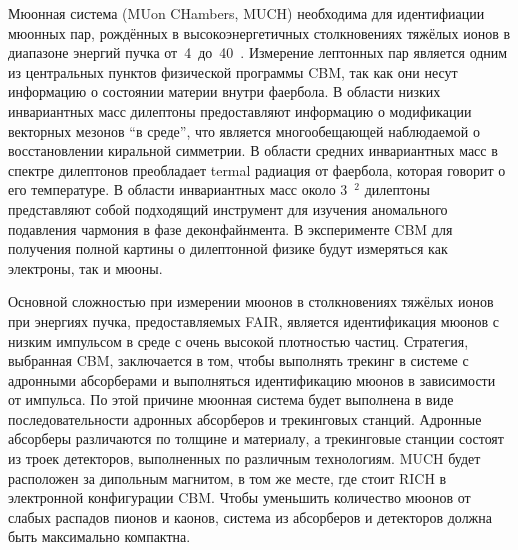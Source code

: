 Мюонная система (MUon CHambers, MUCH) необходима для идентифиации мюонных пар, рождённых в высокоэнергетичных столкновениях тяжёлых ионов в диапазоне энергий пучка от~4~до~40~\GeVperNucl. Измерение лептонных пар является одним из центральных пунктов физической программы CBM, так как они несут информацию о состоянии материи внутри фаербола. В области низких инвариантных масс дилептоны предоставляют информацию о модификации векторных мезонов ``в среде'', что является многообещающей наблюдаемой о восстановлении киральной симметрии. В области средних инвариантных масс в спектре дилептонов преобладает termal \todo радиация от фаербола, которая говорит о его температуре. В области инвариантных масс около 3~\GeVoverC$^{2} $ дилептоны представляют собой подходящий инструмент для изучения аномального подавления чармония в фазе деконфайнмента. В эксперименте CBM для получения полной картины о дилептонной физике будут измеряться как электроны, так и мюоны.


Основной сложностью при измерении мюонов в столкновениях тяжёлых ионов при энергиях пучка, предоставляемых FAIR, является идентификация мюонов с низким импульсом в среде с очень высокой плотностью частиц. Стратегия, выбранная CBM, заключается в том, чтобы выполнять трекинг в системе с адронными абсорберами и выполняться идентификацию мюонов в зависимости от импульса. По этой причине мюонная система будет выполнена в виде последовательности адронных абсорберов и трекинговых станций. Адронные абсорберы различаются по толщине и материалу, а трекинговые станции состоят из троек детекторов, выполненных по различным технологиям. MUCH будет расположен за дипольным магнитом, в том же месте, где стоит RICH в электронной конфигурации CBM. Чтобы уменьшить количество мюонов от слабых распадов пионов и каонов, система из абсорберов и детекторов должна быть максимально компактна.


